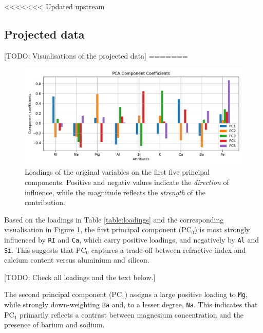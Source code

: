 \documentclass[dtu]{dtuarticle}
\newcommand{\todo}[1]{\color{red}[TODO: #1]\color{black}}
\begin{document}
<<<<<<< Updated upstream
	\subsection{Projected data}

	\todo{Visualisations of the projected data}
=======
	\begin{figure}
		\centering
		\includegraphics[width=.99\textwidth]{figures/pca_component_coefficients}
		\caption{Loadings of the original variables on the first five principal components. Positive and negativ values indicate the \textit{direction} of influence, while the magnitude reflects the \textit{strength} of the contribution.}
		\label{fig:pc-components}
	\end{figure}

	Based on the loadings in Table \ref{table:loadings} and the corresponding visualisation in Figure \ref{fig:pc-components}, the first principal component ($\text{PC}_0$) is most strongly influenced by \texttt{RI} and \texttt{Ca}, which carry positive loadings, and negatively by \texttt{Al} and \texttt{Si}. This suggests that $\text{PC}_0$ captures a trade-off between refractive index and calcium content versus aluminium and silicon.


	\todo{Check all loadings and the text below.}

	The second principal component ($\text{PC}_1$) assigns a large positive loading to \texttt{Mg}, while strongly down-weighting \texttt{Ba} and, to a lesser degree, \texttt{Na}. This indicates that $\text{PC}_1$ primarily reflects a contrast between magnesium concentration and the presence of barium and sodium.
\end{document}

